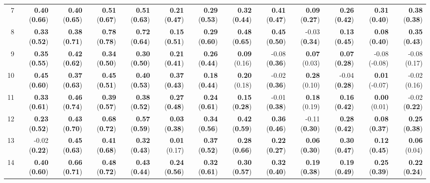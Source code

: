 \begin{sidewaystable}[ht]
\begin{center}
\begin{tabular}{rrrrr|rrrr|rrrr}
    7 & {\bf 0.40} ({\bf 0.66}) & {\bf 0.40} ({\bf 0.65}) & {\bf 0.51} ({\bf 0.67}) & {\bf 0.51} ({\bf 0.63}) & {\bf 0.21} ({\bf 0.47}) & {\bf 0.29} ({\bf 0.53}) & {\bf 0.32} ({\bf 0.44}) & {\bf 0.41} ({\bf 0.47}) & {\bf 0.09} ({\bf 0.27}) & {\bf 0.26} ({\bf 0.42}) & {\bf 0.31} ({\bf 0.40}) & {\bf 0.38} ({\bf 0.38}) \\ 
    8 & {\bf 0.33} ({\bf 0.52}) & {\bf 0.38} ({\bf 0.71}) & {\bf 0.78} ({\bf 0.78}) & {\bf 0.72} ({\bf 0.64}) & {\bf 0.15} ({\bf 0.51}) & {\bf 0.29} ({\bf 0.60}) & {\bf 0.48} ({\bf 0.65}) & {\bf 0.45} ({\bf 0.50}) & -0.03 ({\bf 0.34}) & {\bf 0.13} ({\bf 0.45}) & {\bf 0.08} ({\bf 0.40}) & {\bf 0.35} ({\bf 0.43}) \\ 
    9 & {\bf 0.35} ({\bf 0.55}) & {\bf 0.42} ({\bf 0.62}) & {\bf 0.34} ({\bf 0.50}) & {\bf 0.30} ({\bf 0.50}) & {\bf 0.21} ({\bf 0.41}) & {\bf 0.26} ({\bf 0.44}) & {\bf 0.09} (0.16) & -0.08 ({\bf 0.36}) & {\bf 0.07} (0.03) & {\bf 0.07} ({\bf 0.28}) & -0.08 (-0.08) & -0.08 (0.17) \\ 
    10 & {\bf 0.45} ({\bf 0.60}) & {\bf 0.37} ({\bf 0.63}) & {\bf 0.45} ({\bf 0.51}) & {\bf 0.40} ({\bf 0.53}) & {\bf 0.37} ({\bf 0.43}) & {\bf 0.18} ({\bf 0.44}) & {\bf 0.20} (0.18) & -0.02 ({\bf 0.36}) & {\bf 0.28} (0.10) & -0.04 ({\bf 0.28}) & {\bf 0.01} (-0.07) & -0.02 (0.16) \\ 
    11 & {\bf 0.33} ({\bf 0.61}) & {\bf 0.46} ({\bf 0.74}) & {\bf 0.39} ({\bf 0.57}) & {\bf 0.38} ({\bf 0.52}) & {\bf 0.27} ({\bf 0.48}) & {\bf 0.24} ({\bf 0.61}) & {\bf 0.15} ({\bf 0.28}) & -0.01 ({\bf 0.38}) & {\bf 0.18} (0.19) & {\bf 0.16} ({\bf 0.42}) & {\bf 0.00} (0.01) & -0.02 ({\bf 0.22}) \\ 
    12 & {\bf 0.23} ({\bf 0.52}) & {\bf 0.43} ({\bf 0.70}) & {\bf 0.68} ({\bf 0.72}) & {\bf 0.57} ({\bf 0.59}) & {\bf 0.03} ({\bf 0.38}) & {\bf 0.34} ({\bf 0.56}) & {\bf 0.42} ({\bf 0.59}) & {\bf 0.36} ({\bf 0.46}) & -0.11 ({\bf 0.30}) & {\bf 0.28} ({\bf 0.42}) & {\bf 0.08} ({\bf 0.37}) & {\bf 0.25} ({\bf 0.38}) \\ 
    13 & -0.02 ({\bf 0.22}) & {\bf 0.45} ({\bf 0.63}) & {\bf 0.41} ({\bf 0.68}) & {\bf 0.32} ({\bf 0.43}) & {\bf 0.01} (0.17) & {\bf 0.37} ({\bf 0.52}) & {\bf 0.28} ({\bf 0.66}) & {\bf 0.22} ({\bf 0.27}) & {\bf 0.06} ({\bf 0.30}) & {\bf 0.30} ({\bf 0.47}) & {\bf 0.12} ({\bf 0.45}) & {\bf 0.06} (0.04) \\ 
    14 & {\bf 0.40} ({\bf 0.60}) & {\bf 0.66} ({\bf 0.71}) & {\bf 0.48} ({\bf 0.72}) & {\bf 0.43} ({\bf 0.44}) & {\bf 0.24} ({\bf 0.56}) & {\bf 0.32} ({\bf 0.61}) & {\bf 0.30} ({\bf 0.57}) & {\bf 0.32} ({\bf 0.40}) & {\bf 0.19} ({\bf 0.38}) & {\bf 0.19} ({\bf 0.49}) & {\bf 0.25} ({\bf 0.39}) & {\bf 0.22} ({\bf 0.24}) \\ 

\end{tabular}
\end{center}
\end{sidewaystable}
